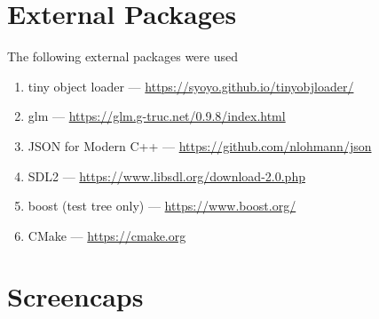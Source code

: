 \section{External Packages}
The following external packages were used 
\begin{enumerate}
    \item tiny object loader --- \url{https://syoyo.github.io/tinyobjloader/}
    \item glm --- \url{https://glm.g-truc.net/0.9.8/index.html}
    \item JSON for Modern C++ --- \url{https://github.com/nlohmann/json}
    \item SDL2 --- \url{https://www.libsdl.org/download-2.0.php}
    \item boost (test tree only) --- \url{https://www.boost.org/}
    \item CMake --- \url{https://cmake.org}
\end{enumerate}

\section{Screencaps}

